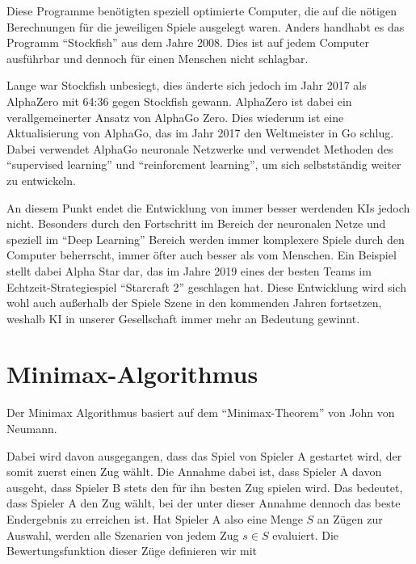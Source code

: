 
Diese Programme benötigten speziell optimierte Computer, die auf die nötigen Berechnungen für die jeweiligen Spiele ausgelegt waren. Anders handhabt es das Programm ``Stockfish'' aus dem Jahre 2008. Dies ist auf jedem Computer ausführbar und dennoch für einen Menschen nicht schlagbar.

Lange war Stockfish unbesiegt, dies änderte sich jedoch im Jahr 2017 als AlphaZero mit 64:36 gegen Stockfish gewann. AlphaZero ist dabei ein verallgemeinerter Ansatz von AlphaGo Zero. Dies wiederum ist eine Aktualisierung von AlphaGo, das im Jahr 2017 den Weltmeister in Go schlug. Dabei verwendet AlphaGo neuronale Netzwerke und verwendet Methoden des ``supervised learning'' und ``reinforcment learning'', um sich selbstständig weiter zu entwickeln. \cite{Fischer}


An diesem Punkt endet die Entwicklung von immer besser werdenden KIs jedoch nicht. Besonders durch den Fortschritt im Bereich der neuronalen Netze und speziell im ``Deep Learning'' Bereich werden immer komplexere Spiele durch den Computer beherrscht, immer öfter auch besser als vom Menschen. Ein Beispiel stellt dabei Alpha Star dar, das im Jahre 2019 eines der besten Teams im Echtzeit-Strategiespiel ``Starcraft 2'' geschlagen hat. Diese Entwicklung wird sich wohl auch außerhalb der Spiele Szene in den kommenden Jahren fortsetzen, weshalb KI in unserer Gesellschaft immer mehr an Bedeutung gewinnt. \cite{OriolVinyalsIgorBabuschkinJunyoungChungMichaelMathieuMaxJaderbergWojtekCzarneckiAndrewDudzikAjaHuangPetkoGeorgievRichardPowellTimoEwaldsDanHorganManuelKroissIvoDanihelkaJohnAgapiouJunhyukOhValentinDalibard}


\section{Minimax-Algorithmus}\label{minimax}

Der Minimax Algorithmus basiert auf dem ``Minimax-Theorem'' von John von Neumann.

Dabei wird davon ausgegangen, dass das Spiel von Spieler A gestartet wird, der somit zuerst einen Zug wählt. Die Annahme dabei ist, dass Spieler A davon ausgeht, dass Spieler B stets den für ihn besten Zug spielen wird. Das bedeutet, dass Spieler A den Zug wählt, bei der unter dieser Annahme dennoch das beste Endergebnis zu erreichen ist. Hat Spieler A also eine Menge $S$ an Zügen zur Auswahl, werden alle Szenarien von jedem Zug $s \in S$ evaluiert. Die Bewertungsfunktion dieser Züge definieren wir mit


